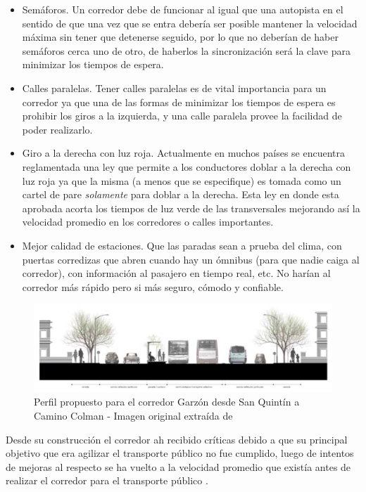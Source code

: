 \begin{itemize}
	\item Semáforos. Un corredor debe de funcionar al igual que una autopista en el sentido de que una vez que se entra debería ser posible mantener la velocidad máxima sin tener que detenerse seguido, por lo que no deberían de haber semáforos cerca uno de otro, de haberlos la sincronización será la clave para minimizar los tiempos de espera.
	\item Calles paralelas. Tener calles paralelas es de vital importancia para un corredor ya que una de las formas de minimizar los tiempos de espera es prohibir los giros a la izquierda, y una calle paralela provee la facilidad de poder realizarlo.
	\item Giro a la derecha con luz roja. Actualmente en muchos países se encuentra reglamentada una ley que permite a los conductores doblar a la derecha con luz roja ya que la misma (a menos que se especifique) es tomada como un cartel de pare \emph{solamente} para doblar a la derecha. Esta ley en donde esta aprobada acorta los tiempos de luz verde de las transversales mejorando así la velocidad promedio en los corredores o calles importantes.
	\item Mejor calidad de estaciones. Que las paradas sean a prueba del clima, con puertas corredizas que abren cuando hay un ómnibus (para que nadie caiga al corredor), con información al pasajero en tiempo real, etc. No harían al corredor más rápido pero si más seguro, cómodo y confiable.
\end{itemize}


\begin{figure}[H]
	\centering
	\includegraphics[width=0.9\linewidth]{Figures/busway_configuration}
	\caption{Perfil propuesto para el corredor Garzón desde San Quintín a Camino Colman - Imagen original extraída de \citep{PlanMovilidad}
	}
	\label{fig:perfil_garzon}
\end{figure}

Desde su construcción el corredor ah recibido críticas debido a que su principal objetivo que era agilizar el transporte público no fue cumplido, luego de intentos de mejoras al respecto se ha vuelto a la velocidad promedio que existía antes de realizar el corredor para el transporte público \citep{olivera2015}.


